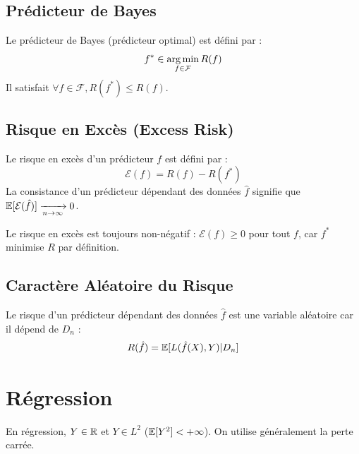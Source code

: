 \subsection{Prédicteur de Bayes}

\begin{definition}
Le prédicteur de Bayes (prédicteur optimal) est défini par :
\begin{equation}
f^{*}\in \operatorname*{arg\,min}_{f\in\mathcal{F}}R(f)
\end{equation}
Il satisfait $\forall f\in\mathcal{F}, R(f^{*})\le R(f)$.
\end{definition}

\subsection{Risque en Excès (Excess Risk)}

\begin{definition}
Le risque en excès d'un prédicteur $f$ est défini par :
\begin{equation}
\mathcal{E}(f)=R(f)-R(f^{*})
\end{equation}
La consistance d'un prédicteur dépendant des données $\hat{f}$ signifie que $\mathbb{E}[\mathcal{E}(\hat{f})]\xrightarrow[n\rightarrow\infty]{} 0$.
\end{definition}

\begin{remarque}
Le risque en excès est toujours non-négatif : $\mathcal{E}(f) \ge 0$ pour tout $f$, car $f^*$ minimise $R$ par définition.
\end{remarque}

\subsection{Caractère Aléatoire du Risque}

Le risque d'un prédicteur dépendant des données $\hat{f}$ est une variable aléatoire car il dépend de $D_n$ :
\begin{equation}
R(\hat{f})=\mathbb{E}[L(\hat{f}(X),Y)|D_{n}]
\end{equation}


\section{Régression}

En régression, $Y \in \mathbb{R}$ et $Y \in L^2$ ($\mathbb{E}[Y^2] < +\infty$). On utilise généralement la perte carrée.


